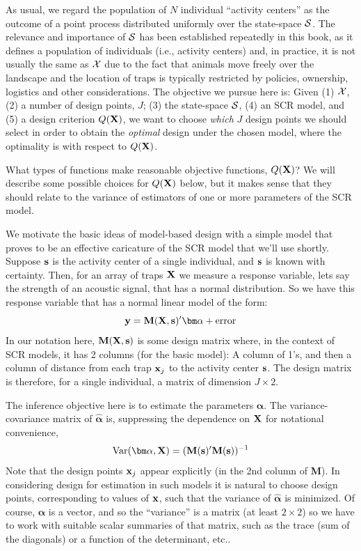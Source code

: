 As usual, we regard the population of $N$ individual ``activity
centers'' as the outcome of a point process
 distributed uniformly
over the state-space ${\cal S}$.  The relevance and importance of
${\cal S}$ has been established repeatedly in this book, as it
defines a population of individuals (i.e., activity
centers) and, in practice, it is not usually the same as ${\cal X}$
due to the fact that animals move freely over the landscape and the
location of traps is typically restricted by policies, ownership, logistics and
other considerations.  
The objective we pursue here is: Given (1)
${\cal X}$, (2) a number of design points, $J$; (3) the state-space
${\cal S}$,
(4) an SCR model, and (5) a design criterion $Q({\bf X})$, we want
to choose {\it which} $J$ design points we should select in order to
obtain the {\it optimal} design under the chosen model, where the
optimality is with respect to $Q({\bf X})$.

What types of functions make reasonable objective functions, $Q({\bf
  X})$?  We will describe some possible choices for $Q({\bf X})$
below, but it makes sense that they should relate to the variance of
estimators of one or more parameters of the SCR model.

We motivate the basic ideas of model-based design with a simple model
that proves to be an effective caricature of the SCR model that we'll
use shortly. Suppose ${\bf s}$ is the activity center of a single
individual, and ${\bf s}$ is known with certainty.  Then, for an array
of traps ${\bf X}$ we measure a response variable, lets say the
strength of an
acoustic signal,
 that has a normal
distribution.
So we have this response variable that has a normal
linear model of the form:
\[
{\bf y} = {\bf M}({\bf X},{\bf s})'{\bm \alpha} + \mbox{error}
\]
In our notation here, ${\bf M}({\bf X},{\bf s})$ is some design matrix
where, in the context of SCR models, it has 2 columns (for the basic
model): A column of 1's, and then a column of distance from each trap
${\bf x}_{j}$ to the activity center ${\bf s}$. The design matrix is
therefore, for a single individual, a matrix of dimension $J \times
2$.

The inference objective here is to estimate the parameters ${\bm
  \alpha}$.  The variance-covariance matrix of $\hat{\bm \alpha}$ is,
suppressing the dependence on ${\bf X}$ for notational convenience,
\[
 \mbox{Var}( {\bm \alpha},{\bf X}) = ({\bf M}({\bf s})'{\bf M}({\bf s}))^{-1}
\]
Note that the design points ${\bf x}_{j}$ appear explicitly (in the
2nd column of {\bf M}).  In considering design for estimation in such
models it is natural to choose design points, corresponding to values
of ${\bf x}$, such that the variance of $\hat{\bm \alpha}$ is
minimized.  Of course, ${\bm \alpha}$ is a vector, and so the
``variance'' is a matrix (at least $2 \times 2$) so we have to work
with suitable scalar summaries of that matrix, such as the trace (sum
of the diagonals) or a function of the determinant, etc.. 

